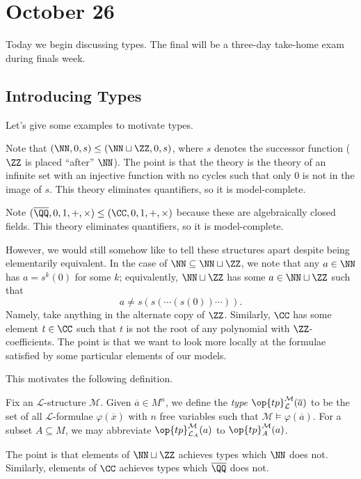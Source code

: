 \documentclass[../notes.tex]{subfiles}
\begin{document}
\section{October 26}

Today we begin discussing types. The final will be a three-day take-home exam during finals week.

\subsection{Introducing Types}
Let's give some examples to motivate types.
\begin{example}
	Note that $(\NN,0,s)\le(\NN\sqcup\ZZ,0,s)$, where $s$ denotes the successor function ($\ZZ$ is placed ``after'' $\NN$). The point is that the theory is the theory of an infinite set with an injective function with no cycles such that only $0$ is not in the image of $s$. This theory eliminates quantifiers, so it is model-complete.
\end{example}
\begin{example}
	Note $(\overline\QQ,0,1,+,\times)\le(\CC,0,1,+,\times)$ because these are algebraically closed fields. This theory eliminates quantifiers, so it is model-complete.
\end{example}
However, we would still somehow like to tell these structures apart despite being elementarily equivalent. In the case of $\NN\subseteq\NN\sqcup\ZZ$, we note that any $a\in\NN$ has $a=s^k(0)$ for some $k$; equivalently, $\NN\sqcup\ZZ$ has some $a\in\NN\sqcup\ZZ$ such that
\[a\ne s(s(\cdots(s(0))\cdots)).\]
Namely, take anything in the alternate copy of $\ZZ$. Similarly, $\CC$ has some element $t\in\CC$ such that $t$ is not the root of any polynomial with $\ZZ$-coefficients. The point is that we want to look more locally at the formulae satisfied by some particular elements of our models.

This motivates the following definition.
\begin{definition}[type]
	Fix an $\mathcal L$-structure $\mathcal M$. Given $\overline a\in M^n$, we define the \textit{type} $\op{tp}_{\mathcal L}^{\mathcal M}(\overline a)$ to be the set of all $\mathcal L$-formulae $\varphi(\overline x)$ with $n$ free variables such that $\mathcal M\models\varphi(\overline a)$. For a subset $A\subseteq M$, we may abbreviate $\op{tp}_{\mathcal L_A}^{\mathcal M}(a)$ to $\op{tp}_A^{\mathcal M}(a)$.
\end{definition}
The point is that elements of $\NN\sqcup\ZZ$ achieves types which $\NN$ does not. Similarly, elements of $\CC$ achieves types which $\overline\QQ$ does not.
\end{document}

